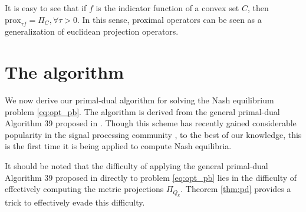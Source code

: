 \documentclass{article} %
\begin{document}
It is easy to see that if $f$ is the indicator function of a convex set $C$, then $\text{prox}_{\tau f} = \Pi_C, \forall \tau > 0$. In this sense, proximal operators can be seen
as a generalization of euclidean projection operators.

\section{The algorithm}
We now derive our primal-dual algorithm for solving the Nash equilibrium problem \eqref{eq:opt_pb}. The algorithm is derived from the general primal-dual Algorithm 39 proposed in \cite{chambolle2010}. Though this scheme has recently gained considerable popularity in the signal processing community
, to the best of our knowledge, this is the first time it is being applied to compute Nash equilibria.

It should be noted that the difficulty of applying the general primal-dual Algorithm 39 proposed in \cite{chambolle2010} directly to problem \eqref{eq:opt_pb} lies in the difficulty of effectively computing the metric projections $\Pi_{Q_k}$. Theorem \ref{thm:pd} provides a trick to effectively evade this difficulty.
\end{document}
